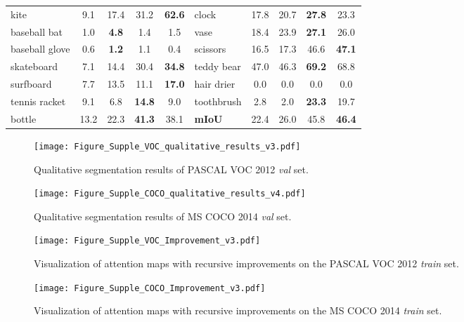 \documentclass[11pt]{article}
\begin{document}
\begin{table*}[t]
\begin{scriptsize}
\begin{tabular}{
    p{} c c c c | p{} c c c c}
    kite & 9.1 & 17.4 & 31.2 & \textbf{62.6} & clock & 17.8 & 20.7 & \textbf{27.8} & 23.3 \\
    baseball bat & 1.0 & \textbf{4.8} & 1.4 & 1.5 & vase & 18.4 & 23.9 & \textbf{27.1} & 26.0 \\
    baseball glove & 0.6 & \textbf{1.2} & 1.1 & 0.4 & scissors & 16.5 & 17.3 & 46.6 & \textbf{47.1} \\
    skateboard & 7.1 & 14.4 & 30.4 & \textbf{34.8} & teddy bear & 47.0 & 46.3 & \textbf{69.2} & 68.8 \\
    surfboard & 7.7 & 13.5 & 11.1 & \textbf{17.0} & hair drier & 0.0 & 0.0 & 0.0 & 0.0 \\
    tennis racket & 9.1 & 6.8 & \textbf{14.8} & 9.0 & toothbrush & 2.8 & 2.0 & \textbf{23.3} & 19.7 \\\cline{6-10}
    bottle & 13.2 & 22.3 & \textbf{41.3} & 38.1 & \textbf{mIoU} & 22.4 & 26.0 & 45.8 & \textbf{46.4} \\
    \bottomrule
  \end{tabular}
  \end{scriptsize}
  \label{tab:coco_val_detail}
\end{table*}

\clearpage





\begin{figure*}[t]\centering \texttt{[image: Figure\_Supple\_VOC\_qualitative\_results\_v3.pdf]}
    \caption{
        Qualitative segmentation results of PASCAL VOC 2012 \emph{val} set.
    }
    \label{fig:additional_voc_results}
\end{figure*}



 

\begin{figure*}[t]\centering \texttt{[image: Figure\_Supple\_COCO\_qualitative\_results\_v4.pdf]}
    \caption{
        Qualitative segmentation results of MS COCO 2014 \emph{val} set.
    }
    \label{fig:additional_coco_results}
\end{figure*}

\clearpage

\begin{figure*}[t]\centering \texttt{[image: Figure\_Supple\_VOC\_Improvement\_v3.pdf]}
    \caption{
        Visualization of attention maps with recursive improvements on the PASCAL VOC 2012 \emph{train} set.
    }
    \label{fig:additional_voc_att_results}
\end{figure*}

\clearpage

\begin{figure*}[t]\centering \texttt{[image: Figure\_Supple\_COCO\_Improvement\_v3.pdf]}
    \caption{
        Visualization of attention maps with recursive improvements on the MS COCO 2014 \emph{train} set.
    }
    \label{fig:additional_coco_att_results}
\end{figure*}
	
	
\end{document}
